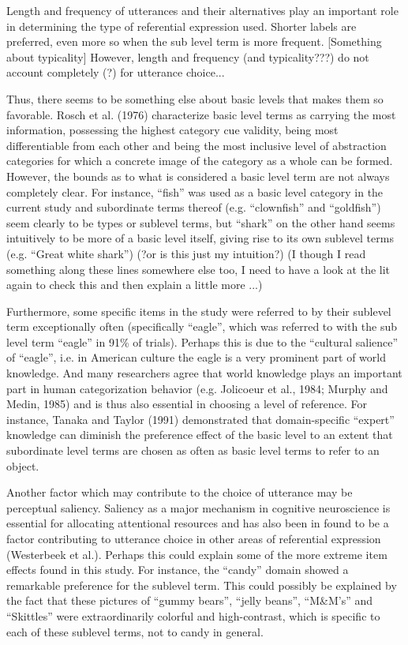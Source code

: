 \documentclass[10pt,letterpaper]{article}
\begin{document}
Length and frequency of utterances and their alternatives play an important role in determining the type of referential expression used. Shorter labels are preferred, even more so when the sub level term is more frequent. [Something about typicality] However, length and frequency (and typicality???) do not account completely (?) for utterance choice...

Thus, there seems to be something else about basic levels that makes them so favorable. Rosch et al. (1976) characterize basic level terms as carrying the most information, possessing the highest category cue validity, being most differentiable from each other and being the most inclusive level of abstraction categories for which a concrete image of the category as a whole can be formed. However, the bounds as to what is considered a basic level term are not always completely clear. For instance, ``fish'' was used as a basic level category in the current study and subordinate terms thereof (e.g. ``clownfish'' and ``goldfish'') seem clearly to be types or sublevel terms, but ``shark'' on the other hand seems intuitively to be more of a basic level itself, giving rise to its own sublevel terms (e.g. ``Great white shark'') (?or is this just my intuition?) (I though I read something along these lines somewhere else too, I need to have a look at the lit again to check this and then explain a little more ...)

Furthermore, some specific items in the study were referred to by their sublevel term exceptionally often (specifically ``eagle'', which was referred to with the sub level term ``eagle'' in 91\% of trials). Perhaps this is due to the ``cultural salience'' of ``eagle'', i.e. in American culture the eagle is a very prominent part of world knowledge. And many researchers agree that world knowledge plays an important part in human categorization behavior (e.g. Jolicoeur et al., 1984; Murphy and Medin, 1985) and is thus also essential in choosing a level of reference. For instance, Tanaka and Taylor (1991) demonstrated that domain-specific ``expert'' knowledge can diminish the preference effect of the basic level to an extent that subordinate level terms are chosen as often as basic level terms to refer to an object.

Another factor which may contribute to the choice of utterance may be perceptual saliency. Saliency as a major mechanism in cognitive neuroscience is essential for allocating attentional resources and has also been in found to be a factor contributing to utterance choice in other areas of referential expression (Westerbeek et al.). Perhaps this could explain some of the more extreme item effects found in this study. For instance, the ``candy'' domain showed a remarkable preference for the sublevel term. This could possibly be explained by the fact that these pictures of ``gummy bears'', ``jelly beans'', ``M\&M’s'' and ``Skittles'' were extraordinarily colorful and high-contrast, which is specific to each of these sublevel terms, not to candy in general.
\end{document}
